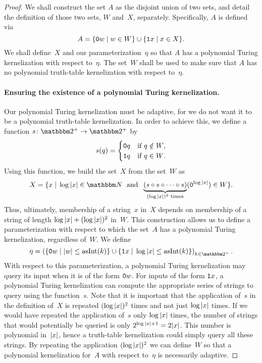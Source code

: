 \begin{proof}
  We shall construct the set $A$ as the disjoint union of two sets, and detail the definition of those two sets, $W$ and~$X$, separately.
  Specifically, $A$ is defined via
  \begin{equation*}
    A = \{\textnormal{\texttt{0}}w \;|\; w \in W\} \cup \{\textnormal{\texttt{1}}x \;|\; x \in X\}.
  \end{equation*}
  We shall define~$X$ and our parameterization~$\eta$ so that $A$ has a polynomial Turing kernelization with respect to~$\eta$.
  The set~$W$ shall be used to make sure that $A$ has no polynomial truth-table kernelization with respect to~$\eta$.

  \paragraph{Ensuring the existence of a polynomial Turing kernelization.}
  Our polynomial Turing kernelization must be adaptive, for we do not want it to be a polynomial truth-table kernelization.
  In order to achieve this, we define a function $s\colon \binary^+ \to \binary^+$ by
  \begin{equation*}
    s(q) = \begin{cases}
      \textnormal{\texttt{0}}q	& \text{if $q \notin W$}, \\
      \textnormal{\texttt{1}}q	& \text{if $q \in W$}.
    \end{cases}
  \end{equation*}
  Using this function, we build the set~$X$ from the set~$W$ as
  \begin{equation*}
    X \deq \{x \st \log\length{x} \in \bbN \reland \underbrace{(s \circ s \circ \cdots \circ s)}_{(\log\length{x})^2\text{ times}}(\bits{0}^{\log\length{x}}) \in W\}.
  \end{equation*}
  Thus, ultimately, membership of a string~$x$ in~$X$ depends on membership of a string of length $\log{\lvert x\rvert} + (\log{\lvert x\rvert})^2$ in~$W$.
  This construction allows us to define a parameterization with respect to which the set~$A$ has a polynomial Turing kernelization, regardless of~$W$.
  We define
  \begin{equation*}
    \eta \deq \left(\{\bits{0}w \st \length{w} \le \asNat(k)\} \cup \{\bits{1}x \st \log\length{x} \le \asNat(k)\}\right)_{k \in \binary^+}.
  \end{equation*}
  With respect to this parameterization, a polynomial Turing kernelization may query its input when it is of the form $\textnormal{\texttt{0}}w$.
  For inputs of the form $\textnormal{\texttt{1}}x$, a polynomial Turing kernelization can compute the appropriate series of strings to query using the function~$s$.
  Note that it is important that the application of~$s$ in the definition of~$X$ is repeated $(\log{\lvert x\rvert})^2$ times and not just $\log{\lvert x\rvert}$ times.
  If we would have repeated the application of~$s$ only $\log{\lvert x\rvert}$ times, the number of strings that would potentially be queried is only $2^{\log{\lvert x\rvert} + 1} = 2{\lvert x\rvert}$.
  This number is polynomial in~${\lvert x\rvert}$, hence a truth-table kernelization could simply query all these strings.
  By repeating the application $(\log{\lvert x\rvert})^2$ we can define~$W$ so that a polynomial kernelization for~$A$ with respect to~$\eta$ is necessarily adaptive.


\end{proof}
